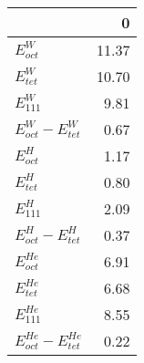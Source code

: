 \begin{tabular}{lr}
\toprule
 & 0 \\
\midrule
$E_{oct}^{W}$ & 11.37 \\
$E_{tet}^{W}$ & 10.70 \\
$E_{111}^{W}$ & 9.81 \\
$E_{oct}^{W} - E_{tet}^{W}$ & 0.67 \\
$E_{oct}^{H}$ & 1.17 \\
$E_{tet}^{H}$ & 0.80 \\
$E_{111}^{H}$ & 2.09 \\
$E_{oct}^{H} - E_{tet}^{H}$ & 0.37 \\
$E_{oct}^{He}$ & 6.91 \\
$E_{tet}^{He}$ & 6.68 \\
$E_{111}^{He}$ & 8.55 \\
$E_{oct}^{He} - E_{tet}^{He}$ & 0.22 \\
\bottomrule
\end{tabular}
